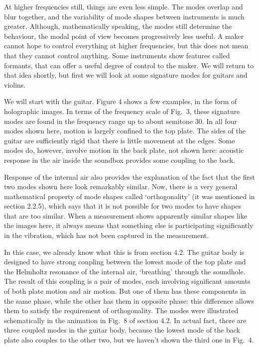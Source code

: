   At higher frequencies still, things are even less simple. The modes overlap 
  and blur together, and the variability of mode shapes between instruments is 
  much greater. Although, mathematically speaking, the modes still determine 
  the behaviour, the modal point of view becomes progressively less useful. A 
  maker cannot hope to control everything at higher frequencies, but this does 
  not mean that they cannot control anything. Some instruments show features 
  called formants, that can offer a useful degree of control to the maker. We 
  will return to that idea shortly, but first we will look at some signature 
  modes for guitars and violins. 

  We will start with the guitar. Figure 4 shows a few examples, in the form of 
  holographic images. In terms of the frequency scale of Fig.\ 3, these 
  signature modes are found in the frequency range up to about semitone 30. In 
  all four modes shown here, motion is largely confined to the top plate. The 
  sides of the guitar are sufficiently rigid that there is little movement at 
  the edges. Some modes do, however, involve motion in the back plate, not 
  shown here: acoustic response in the air inside the soundbox provides some 
  coupling to the back. 

  Response of the internal air also provides the explanation of the fact that 
  the first two modes shown here look remarkably similar. Now, there is a very 
  general mathematical property of mode shapes called `orthogonality' (it was 
  mentioned in section 2.2.5), which says that it is not possible for two modes 
  to have shapes that are too similar. When a measurement shows apparently 
  similar shapes like the images here, it always means that something else is 
  participating significantly in the vibration, which has not been captured in 
  the measurement. 

  In this case, we already know what this is from section 4.2. The guitar body 
  is designed to have strong coupling between the lowest mode of the top plate 
  and the Helmholtz resonance of the internal air, `breathing' through the 
  soundhole. The result of this coupling is a pair of modes, each involving 
  significant amounts of both plate motion and air motion. But one of them has 
  these components in the same phase, while the other has them in opposite 
  phase: this difference allows them to satisfy the requirement of 
  orthogonality. The modes were illustrated schematically in the animation in 
  Fig.\ 8 of section 4.2. In actual fact, there are three coupled modes in the 
  guitar body, because the lowest mode of the back plate also couples to the 
  other two, but we haven't shown the third one in Fig.\ 4. 

